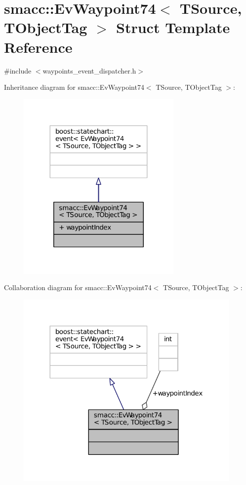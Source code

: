 \hypertarget{structsmacc_1_1EvWaypoint74}{}\section{smacc\+:\+:Ev\+Waypoint74$<$ T\+Source, T\+Object\+Tag $>$ Struct Template Reference}
\label{structsmacc_1_1EvWaypoint74}


{\ttfamily \#include $<$waypoints\+\_\+event\+\_\+dispatcher.\+h$>$}



Inheritance diagram for smacc\+:\+:Ev\+Waypoint74$<$ T\+Source, T\+Object\+Tag $>$\+:
\nopagebreak
\begin{figure}[H]
\begin{center}
\leavevmode
\includegraphics[width=227pt]{structsmacc_1_1EvWaypoint74__inherit__graph}
\end{center}
\end{figure}


Collaboration diagram for smacc\+:\+:Ev\+Waypoint74$<$ T\+Source, T\+Object\+Tag $>$\+:
\nopagebreak
\begin{figure}[H]
\begin{center}
\leavevmode
\includegraphics[width=312pt]{structsmacc_1_1EvWaypoint74__coll__graph}
\end{center}
\end{figure}
